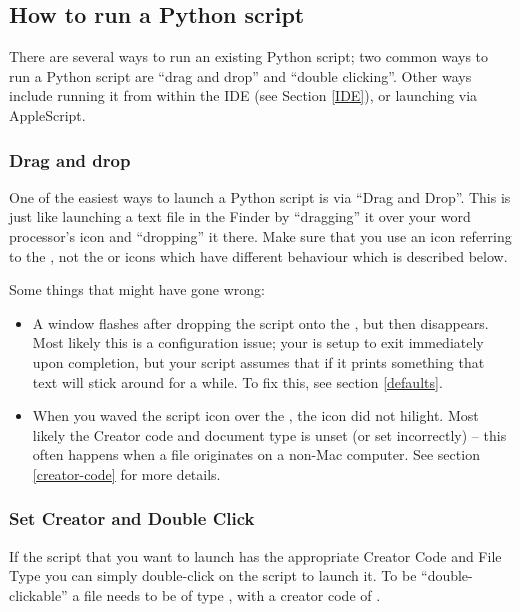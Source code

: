\subsection{How to run a Python script}

There are several ways to run an existing Python script; two common
ways to run a Python script are ``drag and drop'' and ``double
clicking''.  Other ways include running it from within the IDE (see
Section \ref{IDE}), or launching via AppleScript.


\subsubsection{Drag and drop}

One of the easiest ways to launch a Python script is via ``Drag and
Drop''. This is just like launching a text file in the Finder by
``dragging'' it over your word processor's icon and ``dropping'' it
there. Make sure that you use an icon referring to the
, not the  or 
icons which have different behaviour which is described below.

Some things that might have gone wrong:

\begin{itemize}
\item
A window flashes after dropping the script onto the
, but then disappears. Most likely this is a
configuration issue; your  is setup to exit
immediately upon completion, but your script assumes that if it prints
something that text will stick around for a while. To fix this, see
section \ref{defaults}.

\item
When you waved the script icon over the ,
the  icon did not hilight.  Most likely the
Creator code and document type is unset (or set incorrectly) -- this
often happens when a file originates on a non-Mac computer.  See
section \ref{creator-code} for more details.
\end{itemize}


\subsubsection{Set Creator and Double Click \label{creator-code}}

If the script that you want to launch has the appropriate Creator Code
and File Type you can simply double-click on the script to launch it.
To be ``double-clickable'' a file needs to be of type ,
with a creator code of .

